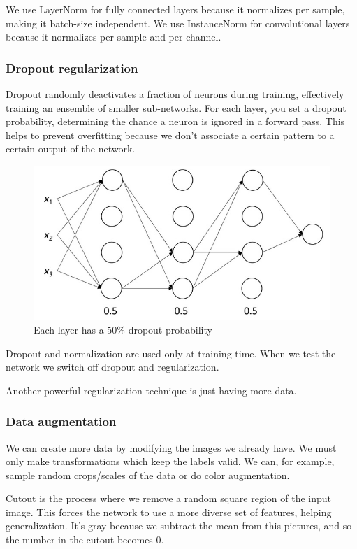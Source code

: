 We use LayerNorm for fully connected layers because it normalizes per sample, making it batch-size independent.
We use InstanceNorm for convolutional layers because it normalizes per sample and per channel.

\subsubsection{Dropout regularization}
Dropout randomly deactivates a fraction of neurons during training, effectively training an ensemble of smaller sub-networks.
For each layer, you set a dropout probability, determining the chance a neuron is ignored in a forward pass.
This helps to prevent overfitting because we don't associate a certain pattern to a certain output of the network.

\begin{figure}[htbp]
  \centering
  \includegraphics[width=0.6\linewidth]{./img/dropout.jpg}
  \caption{Each layer has a $50 \%$ dropout probability}
  \label{fig:dropout}
\end{figure}

Dropout and normalization are used only at training time.
When we test the network we switch off dropout and regularization.

Another powerful regularization technique is just having more data.

\subsubsection{Data augmentation}
We can create more data by modifying the images we already have.
We must only make transformations which keep the labels valid.
We can, for example, sample random crops/scales of the data or do color augmentation.

Cutout is the process where we remove a random square region of the input image.
This forces the network to use a more diverse set of features, helping generalization.
It's gray because we subtract the mean from this pictures, and so the number in the cutout becomes 0.


